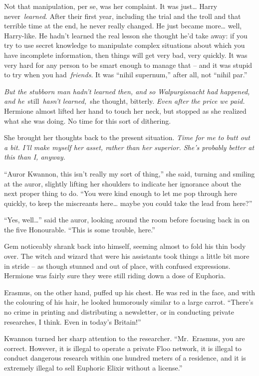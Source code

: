 Not that manipulation, per se, was her complaint. It was just\ldots{}
Harry never~\emph{learned}. After their first year, including the trial
and the troll and that terrible time at the end, he never really
changed. He just became more\ldots{} well, Harry-like. He hadn't learned
the real lesson she thought he'd take away: if you try to use secret
knowledge to manipulate complex situations about which you have
incomplete information, then things will get very bad, very quickly. It
was very hard for any person to be smart enough to manage that -- and it
was stupid to try when you had~\emph{friends}. It was ``nihil
supernum,'' after all, not ``nihil par.''

\emph{But the stubborn man hadn't learned then, and so Walpurgisnacht
had happened, and he}~still~\emph{hasn't learned,}~she thought,
bitterly. \emph{Even after the price we paid. }Hermione almost lifted
her hand to touch her neck, but stopped as she realized what she was
doing. No time for this sort of dithering.

She brought her thoughts back to the present situation. \emph{Time for
me to butt out a bit. I'll make myself her asset, rather than her
superior. She's probably better at this than I, anyway.}

``Auror Kwannon, this isn't really my sort of thing,'' she said, turning
and smiling at the auror, slightly lifting her shoulders to indicate her
ignorance about the next proper thing to do. ``You were kind enough to
let me pop through here quickly, to keep the miscreants here\ldots{}
maybe you could take the lead from here?''

``Yes, well\ldots{}'' said the auror, looking around the room before
focusing back in on the five Honourable. ``This is some trouble, here.''

Gem noticeably shrank back into himself, seeming almost to fold his thin
body over. The witch and wizard that were his assistants took things a
little bit more in stride -- as though stunned and out of place, with
confused expressions. Hermione was fairly sure they were still riding
down a dose of Euphoria.

Erasmus, on the other hand, puffed up his chest. He was red in the face,
and with the colouring of his hair, he looked humorously similar to a
large carrot. ``There's no crime in printing and distributing a
newsletter, or in conducting private researches, I think. Even in
today's Britain!''

Kwannon turned her sharp attention to the researcher. ``Mr.~Erasmus, you
are correct. However, it is illegal to operate a private Floo network,
it is illegal to conduct dangerous research within one hundred meters of
a residence, and it is extremely illegal to sell Euphoric Elixir without
a license.''

